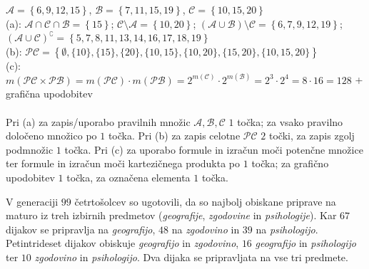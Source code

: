\documentclass[addpoints,12pt]{exam}
\begin{document}
\begin{questions}

    \begin{solution}[9cm]
        $\mathcal{A}=\left\{6,9,12,15\right\}$, $\mathcal{B}=\left\{7,11,15,19\right\}$, $\mathcal{C}=\left\{10,15,20\right\}$ \\
        (a): $\mathcal{A}\cap\mathcal{C}\cap\mathcal{B}=\left\{15\right\}$; $\mathcal{C}\setminus\mathcal{A}=\left\{10,20\right\}$; $(\mathcal{A}\cup\mathcal{B})\setminus\mathcal{C}=\left\{6,7,9,12,19\right\}$; $(\mathcal{A}\cup\mathcal{C})^\complement=\left\{5,7,8,11,13,14,16,17,18,19\right\}$ \\
        (b): $\mathcal{PC}=\left\{\emptyset, \{10\}, \{15\}, \{20\}, \{10,15\}, \{10,20\}, \{15,20\}, \{10,15,20\}\right\}$ \\
        (c): $m(\mathcal{PC}\times\mathcal{PB})=m(\mathcal{PC})\cdot m(\mathcal{PB})=2^{m(\mathcal{C})}\cdot 2^{m(\mathcal{B})} = 2^3\cdot 2^4=8\cdot 16 = 128$ + grafična upodobitev\\ \\
        Pri (a) za zapis/uporabo pravilnih množic $\mathcal{A}, \mathcal{B}, \mathcal{C}$ $1$ točka; za vsako pravilno določeno množico po $1$ točka. Pri (b) za zapis celotne $\mathcal{PC}$ $2$ točki, za zapis zgolj podmnožic $1$ točka. 
        Pri (c) za uporabo formule in izračun moči potenčne množice ter formule in izračun moči kartezičnega produkta po $1$ točka; za grafično upodobitev $1$ točka, za označena elementa $1$ točka.
    \end{solution}


    \newpage
    \question
    V generaciji $99$ četrtošolcev so ugotovili, da so najbolj obiskane priprave na maturo iz treh izbirnih predmetov (\textit{geografije}, \textit{zgodovine} in \textit{psihologije}).
    Kar $67$ dijakov se pripravlja na \textit{geografijo}, $48$ na \textit{zgodovino} in $39$ na \textit{psihologijo}. Petintrideset dijakov obiskuje \textit{geografijo} in \textit{zgodovino},
    $16$ \textit{geografijo} in \textit{psihologijo} ter $10$ \textit{zgodovino} in \textit{psihologijo}. Dva dijaka se pripravljata na vse tri predmete.
    \begin{parts}

\end{parts}
\end{questions}
\end{document}

